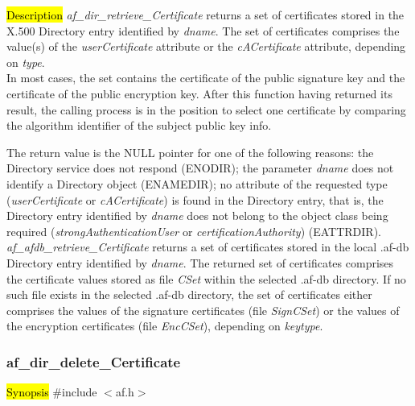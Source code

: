 

\hl{Description}
{\em af\_dir\_retrieve\_Certificate} returns a set of certificates stored in the 
X.500 Directory entry identified by {\em dname}. The set of certificates comprises the
value(s) of the {\em userCertificate} attribute or the {\em cACertificate} attribute,
depending on {\em type}. \\
In most cases, the set contains the certificate of the public signature key and the 
certificate of the public encryption key. After this function having returned 
its result, the calling process is in the position to select one certificate 
by comparing the algorithm identifier of the subject public key info.

The return value is the NULL pointer for one of the following reasons:
\bi
\m the Directory service does not respond (ENODIR);
\m the parameter {\em dname} does not identify a Directory object (ENAMEDIR);
\m no attribute of the requested type ({\em userCertificate} or {\em cACertificate})
is found in the Directory entry, that is, the Directory entry identified by {\em dname} 
does not belong to the object class being required ({\em strongAuthenticationUser} or  
{\em certificationAuthority}) (EATTRDIR).
\ei
{\em af\_afdb\_retrieve\_Certificate} returns a set of certificates stored in the 
local .af-db Directory entry identified by {\em dname}.
The returned set of certificates comprises the certificate values stored as file {\em CSet}
within the selected .af-db directory. If no such file exists
in the selected .af-db directory, the set of certificates either comprises the
values of the signature certificates (file {\em SignCSet}) or the values of the encryption certificates
(file {\em EncCSet}), depending on {\em keytype}.



\subsubsection{af\_dir\_delete\_Certificate}
\hl{Synopsis}
\#include $<$af.h$>$ 

